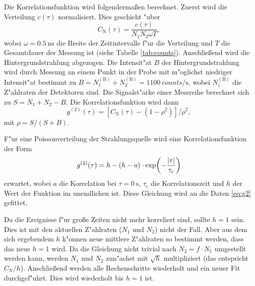 Die Korrelationsfunktion wird folgenderma\ss en berechnet.
Zuerst wird die Verteilung $c(\tau)$ normalisiert.
Dies geschieht "uber
\begin{equation}
C_\text{N}(\tau)
    =\frac{c(\tau)}{N_1N_2\omega T},
    \label{eq:CN}
\end{equation}
wobei $\omega=\SI{0.5}{\nano\second}$ die Breite der Zeitintervalle f"ur die Verteilung und $T$ die Gesamtdauer der Messung ist (siehe Tabelle \vref{tab:counts}).
Anschlie\ss end wird die Hintergrundstrahlung abgezogen.
Die Intensit"at $B$ der Hintergrundstrahlung wird durch Messung an einem Punkt in der Probe mit m"oglichst niedriger Intensit"at bestimmt zu $B=N_1^{(\text{B})}+N_2^{(\text{B})}=\SI{1100}{counts\per\second}$, wobei $N_i^{(\text{B})}$ die Z"ahlraten der Detektoren sind.
Die Signalst"arke einer Messreihe berechnet sich zu $S=N_1+N_2-B$.
Die Korrelationsfunktion wird dann
\begin{equation}
g^{(2)}(\tau)
    =\left[ C_\text{N}(\tau)-(1-\rho^2)\right]/\rho^2,
    \label{eq:g2}
\end{equation}
mit $\rho=S/(S+B)$.

F"ur eine Poissonverteilung der Strahlungsquelle wird eine Korrelationsfunktion der Form
\begin{equation}
g^{(2)}(\tau)
    =h-(h-a)\cdot \exp(-\frac{\abs{\tau}}{\tau_\text{c}})
    \label{eq:fit}
\end{equation}
erwartet, wobei $a$ die Korrelation bei $\tau=\SI{0}{\second}$, $\tau_\text{c}$ die Korrelationszeit und $h$ der Wert der Funktion im unendlichen ist.
Diese Gleichung wird an die Daten \eqref{eq:g2} gefittet.

Da die Ereignisse f"ur gro\ss e Zeiten nicht mehr korreliert sind, sollte $h=1$ sein.
Dies ist mit den aktuellen Z"ahlraten ($N_1$ und $N_2$) nicht der Fall.
Aber aus dem sich ergebendem $h$ k"onnen neue mittlere Z"ahlraten so bestimmt werden, dass das neue $h=1$ wird.
Da die Gleichung nicht trivial nach $N_2=f\cdot N_1$ umgestellt werden kann, werden $N_1$ und $N_2$ zun"achst mit $\sqrt{h}$ multipliziert (das entspricht $C_\text{N}/h$).
Anschlie\ss end werden alle Rechenschritte wiederholt und ein neuer Fit durchgef"uhrt.
Dies wird wiederholt bis $h=1 $ ist.

